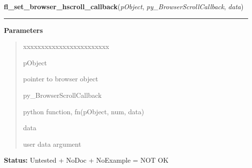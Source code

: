 \hspace{.8\funcindent}\begin{boxedminipage}{\funcwidth}

    \raggedright \textbf{fl\_set\_browser\_hscroll\_callback}(\textit{pObject}, \textit{py\_BrowserScrollCallback}, \textit{data})

    \vspace{-1.5ex}

    \rule{\textwidth}{0.5\fboxrule}
\setlength{\parskip}{2ex}
\setlength{\parskip}{1ex}
      \textbf{Parameters}
      \vspace{-1ex}

      \begin{quote}
        \begin{Ventry}{xxxxxxxxxxxxxxxxxxxxxxxx}

          \item[pObject]

          pointer to browser object

          \item[py\_BrowserScrollCallback]

          python function, fn(pObject, num, data)

          \item[data]

          user data argument

        \end{Ventry}

      \end{quote}

\textbf{Status:} Untested + NoDoc + NoExample = NOT OK



    \end{boxedminipage}

    \label{xformslib:library:fl_set_browser_vscroll_callback}

    \vspace{0.5ex}

